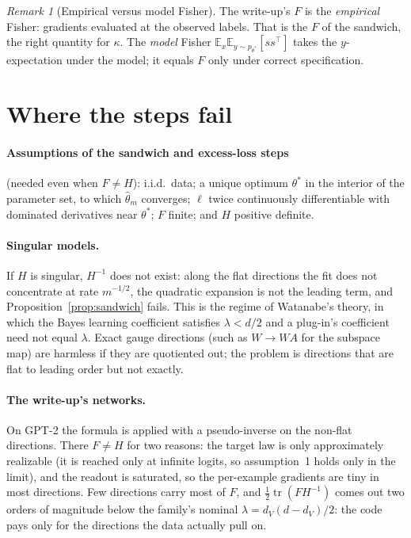 \documentclass[11pt]{article}
\theoremstyle{remark}
\newtheorem*{remark}{Remark}
\newcommand{\E}{\mathbb{E}}
\newcommand{\tr}{\operatorname{tr}}
\newcommand{\ts}{\theta^*}
\newcommand{\hth}{\hat\theta_m}
\begin{document}
\begin{remark}[Empirical versus model Fisher]
The write-up's $F$ is the \emph{empirical} Fisher: gradients evaluated at the observed labels. That is the $F$ of the sandwich, the right quantity for $\kappa$. The \emph{model} Fisher $\E_x\E_{y\sim p_{\ts}}[ss^\top]$ takes the $y$-expectation under the model; it equals $F$ only under correct specification.
\end{remark}

\section{Where the steps fail}
\label{sec:fail}

\paragraph{Assumptions of the sandwich and excess-loss steps} (needed even when $F\neq H$): i.i.d.\ data; a unique optimum $\ts$ in the interior of the parameter set, to which $\hth$ converges; $\ell$ twice continuously differentiable with dominated derivatives near $\ts$; $F$ finite; and $H$ positive definite.

\paragraph{Singular models.} If $H$ is singular, $H^{-1}$ does not exist: along the flat directions the fit does not concentrate at rate $m^{-1/2}$, the quadratic expansion is not the leading term, and Proposition~\ref{prop:sandwich} fails. This is the regime of Watanabe's theory, in which the Bayes learning coefficient satisfies $\lambda<d/2$ and a plug-in's coefficient need not equal $\lambda$. Exact gauge directions (such as $W\to WA$ for the subspace map) are harmless if they are quotiented out; the problem is directions that are flat to leading order but not exactly.

\paragraph{The write-up's networks.} On GPT-2 the formula is applied with a pseudo-inverse on the non-flat directions. There $F\neq H$ for two reasons: the target law is only approximately realizable (it is reached only at infinite logits, so assumption~1 holds only in the limit), and the readout is saturated, so the per-example gradients are tiny in most directions. Few directions carry most of $F$, and $\tfrac12\tr(FH^{-1})$ comes out two orders of magnitude below the family's nominal $\lambda=d_V(d-d_V)/2$: the code pays only for the directions the data actually pull on.
\end{document}
